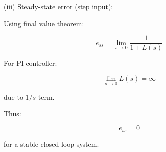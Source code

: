 \documentclass[a4paper,12pt]{article}
\begin{document}
\begin{enumerate}
(iii) Steady-state error (step input):

Using final value theorem:

\[
e_{ss}=\lim_{s\to 0} \frac{1}{1+L(s)}
\]

For PI controller:

\[
\lim_{s\to 0} L(s)=\infty
\]

due to \(1/s\) term.

Thus:

\[
e_{ss}=0
\]

for a stable closed-loop system.

\end{enumerate}

\fi
\end{document}
